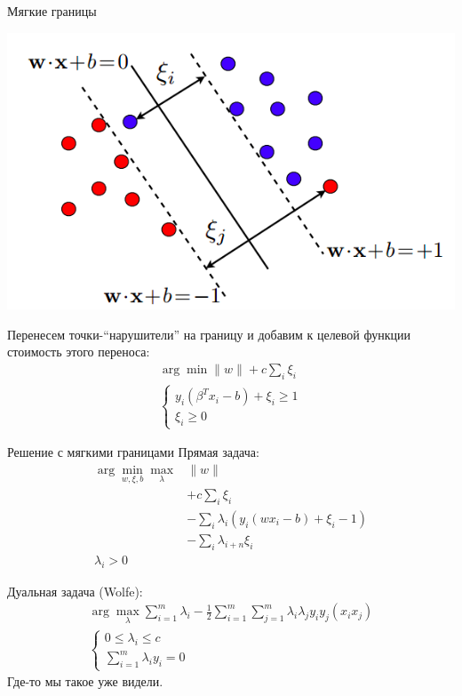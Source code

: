 \documentclass[14pt, fleqn, xcolor={dvipsnames, table}]{beamer}
\begin{document}
\begin{frame}{Мягкие границы}
\begin{center}
\includegraphics[height=0.4\textheight]{SoftMargins.png}
\end{center}
Перенесем точки-``нарушители'' на границу и добавим к целевой функции стоимость этого переноса:
$$\begin{array}{l}
\arg \min \|w\| + c\sum_i \xi_i \\
\left\{\begin{array}{l}
y_i(\beta^T x_i - b) + \xi_i \ge 1 \\
\xi_i \ge 0
\end{array}\right.
\end{array}$$
\end{frame}

\begin{frame}{Решение с мягкими границами}
\small
Прямая задача:
$$\begin{array}{ll}
\arg \min_{w,\xi,b} \max_{\lambda} & \|w\| \\
  & + c\sum_i \xi_i \\
  & - \sum_i \lambda_{i} \left(y_i (w x_i - b) + \xi_i - 1\right) \\
  & - \sum_i \lambda_{i+n} \xi_i \\
\lambda_i > 0
\end{array}$$

Дуальная задача (Wolfe):
$$
\begin{array}{l}  
\arg \max_{\lambda} \sum_{i=1}^m\lambda_i - \frac{1}{2}\sum_{i=1}^m\sum_{j=1}^m\lambda_i\lambda_j y_i y_j (x_i x_j) \\  

\left\{\begin{array}{ll}  
  0 \le \lambda_i \le c & \\
  \sum_{i=1}^m\lambda_i y_i = 0
  \end{array}   
\right.
\end{array}
$$
Где-то мы такое уже видели.
\end{frame}
\end{document}
